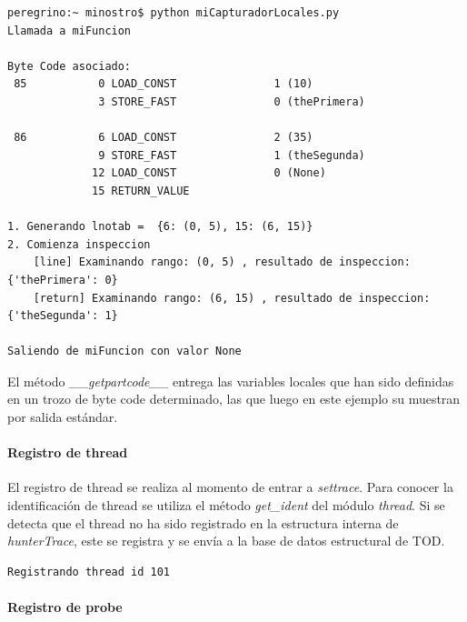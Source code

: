 \documentclass[12pt,legalpaper]{report}
\begin{document}
\begin{singlespace}
\begin{lstlisting}[style=consola,numbers=none]
peregrino:~ minostro$ python miCapturadorLocales.py
Llamada a miFuncion

Byte Code asociado:
 85           0 LOAD_CONST               1 (10)
              3 STORE_FAST               0 (thePrimera)

 86           6 LOAD_CONST               2 (35)
              9 STORE_FAST               1 (theSegunda)
             12 LOAD_CONST               0 (None)
             15 RETURN_VALUE        

1. Generando lnotab =  {6: (0, 5), 15: (6, 15)}
2. Comienza inspeccion
    [line] Examinando rango: (0, 5) , resultado de inspeccion: {'thePrimera': 0}
    [return] Examinando rango: (6, 15) , resultado de inspeccion: {'theSegunda': 1}
    
Saliendo de miFuncion con valor None
\end{lstlisting}
\end{singlespace}



El método \textit{\_\_getpartcode\_\_} entrega las variables locales que han sido definidas en un trozo de byte code determinado, las que luego en este ejemplo su muestran por salida estándar.

				\paragraph{Registro de thread}
				
El registro de thread se realiza al momento de entrar a \textit{settrace}. Para conocer la identificación de thread se utiliza el método \textit{get\_ident} del módulo \textit{thread}.  Si se detecta que el thread no ha sido registrado en la estructura interna de \textit{hunterTrace}, este se registra y se envía a la base de datos estructural de TOD.

\begin{singlespace}
\begin{lstlisting}[style=consola,numbers=none]
Registrando thread id 101
\end{lstlisting}
\end{singlespace}
				
				\paragraph{Registro de probe}
				
\end{document}
